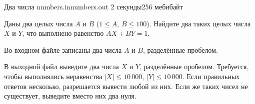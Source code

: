 \begin{problem}{Два числа}
{numbers.in}{numbers.out}
{2 секунды}{256 мебибайт}{}

Даны два целых числа $A$ и $B$ ($1 \le A, \, B \le 100$).
Найдите два таких целых числа $X$ и $Y$,
что выполнено равенство $A X + B Y = 1$.

\InputFile

Во входном файле записаны два числа $A$ и $B$, разделённые пробелом.

\OutputFile

В выходной файл выведите два числа $X$ и $Y$, разделённые пробелом.
Требуется, чтобы выполнялись неравенства $|X| \le 10\,000$, $|Y| \le 10\,000$.
Если правильных ответов несколько, разрешается вывести любой из них.
Если же таких чисел не существует, выведите вместо них два нуля.

\Examples

\begin{example}
%
%
%
\end{example}

\end{problem}
